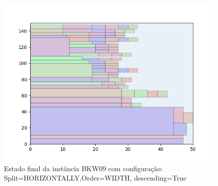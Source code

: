 \begin{figure}[H]
    \centering
    \caption[]{Estado final da instância BKW09 com configuração: Split=HORIZONTALLY,Order=WIDTH, descending=True}
    \label{fig:bkw09-horizontally-width-true}
    \includegraphics[scale=0.5]{output/figures/bkw/bkw09/horizontally/width/true/000}
\end{figure}